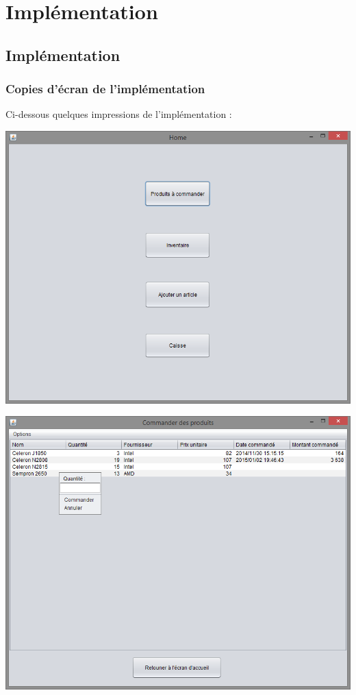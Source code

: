 \part{Implémentation}

\chapter{Implémentation}

\section{Copies d'écran de l'implémentation}
Ci-dessous quelques impressions de l'implémentation :

\begin{center}
	\includegraphics[width=14cm]{./Implementation/home}
\end{center}

\begin{center}
	\includegraphics[width=14cm]{./Implementation/acommander}
\end{center}


